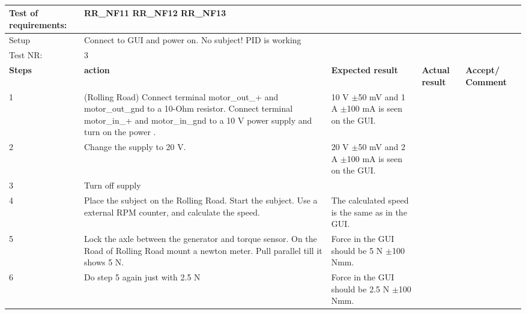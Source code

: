 \begin{table}[h!]
	\centering
	\label{my-label}	
	\begin{tabular}{|p{1.5 cm}|p{4.2 cm}|p{2.1 cm}|p{2.1 cm}|p{2.1 cm}|}
		\hline
		Test of requirements: 
		& \multicolumn{4}{l|}{RR\_NF11 RR\_NF12 RR\_NF13} \\ \hline
		Setup 
		& \multicolumn{4}{l|}{Connect to GUI and power on. No subject! PID is working} \\ \hline
		Test NR:
		& \multicolumn{4}{l|}{3} \\ \hline
		\textbf{Steps} & \textbf{action} & \textbf{Expected result} & 
		\textbf{Actual result} & \textbf{Accept/ Comment} \\ \hline
		1 
		& (Rolling Road) Connect terminal motor\_out\_+ and motor\_out\_gnd to a 10-Ohm resistor. Connect terminal motor\_in\_+ and motor\_in\_gnd to a 10 V power supply and turn on the power .  
		& 10 V $\pm$50 mV and 1 A $\pm$100 mA is seen on the GUI. 
		&
		& \\ \hline
		2
		& Change the supply to 20 V.
		& 20 V $\pm$50 mV and 2 A $\pm$100 mA is seen on the GUI.
		&
		& \\ \hline
		3
		& Turn off supply
		& 
		&
		& \\ \hline
		4
		& Place the subject on the Rolling Road. Start the subject. Use a external RPM counter, and calculate the speed. 
		& The calculated speed is the same as in the GUI.
		&
		& \\ \hline
		5
		& Lock the axle between the generator and torque sensor. On the Road of Rolling Road mount a newton meter. Pull parallel till it shows 5 N.  
		& Force in the GUI should be 5 N $\pm$100 Nmm.
		&
		& \\ \hline
		6
		& Do step 5 again just with 2.5 N 
		& Force in the GUI should be 2.5 N $\pm$100 Nmm.
		&
		& \\ \hline
	\end{tabular}
	\caption{}
\end{table}


